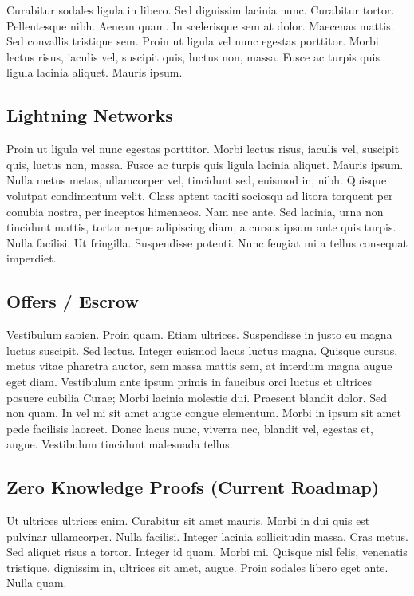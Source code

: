 \documentclass[peerreview]{ieeesyscoin}
\begin{document}
Curabitur sodales ligula in libero. Sed dignissim lacinia nunc. Curabitur tortor. Pellentesque nibh. Aenean quam. In scelerisque sem at dolor. Maecenas mattis. Sed convallis tristique sem. Proin ut ligula vel nunc egestas porttitor. Morbi lectus risus, iaculis vel, suscipit quis, luctus non, massa. Fusce ac turpis quis ligula lacinia aliquet. Mauris ipsum. 

\subsection{Lightning Networks}
Proin ut ligula vel nunc egestas porttitor. Morbi lectus risus, iaculis vel, suscipit quis, luctus non, massa. Fusce ac turpis quis ligula lacinia aliquet. Mauris ipsum. Nulla metus metus, ullamcorper vel, tincidunt sed, euismod in, nibh. Quisque volutpat condimentum velit. Class aptent taciti sociosqu ad litora torquent per conubia nostra, per inceptos himenaeos. Nam nec ante. Sed lacinia, urna non tincidunt mattis, tortor neque adipiscing diam, a cursus ipsum ante quis turpis. Nulla facilisi. Ut fringilla. Suspendisse potenti. Nunc feugiat mi a tellus consequat imperdiet. 

\subsection{Offers / Escrow}
Vestibulum sapien. Proin quam. Etiam ultrices. Suspendisse in justo eu magna luctus suscipit. Sed lectus. Integer euismod lacus luctus magna. Quisque cursus, metus vitae pharetra auctor, sem massa mattis sem, at interdum magna augue eget diam. Vestibulum ante ipsum primis in faucibus orci luctus et ultrices posuere cubilia Curae; Morbi lacinia molestie dui. Praesent blandit dolor. Sed non quam. In vel mi sit amet augue congue elementum. Morbi in ipsum sit amet pede facilisis laoreet. Donec lacus nunc, viverra nec, blandit vel, egestas et, augue. Vestibulum tincidunt malesuada tellus. 

\subsection{Zero Knowledge Proofs (Current Roadmap)}
Ut ultrices ultrices enim. Curabitur sit amet mauris. Morbi in dui quis est pulvinar ullamcorper. Nulla facilisi. Integer lacinia sollicitudin massa. Cras metus. Sed aliquet risus a tortor. Integer id quam. Morbi mi. Quisque nisl felis, venenatis tristique, dignissim in, ultrices sit amet, augue. Proin sodales libero eget ante. Nulla quam. 
\end{document}
